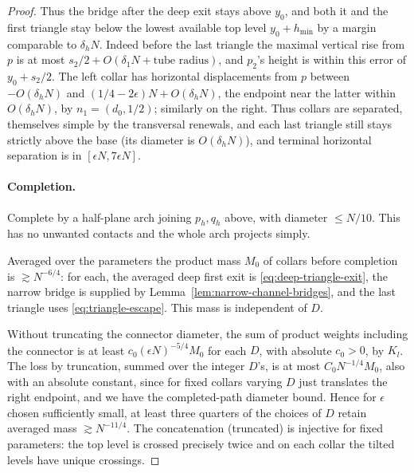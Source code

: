 \begin{proof}
Thus the bridge after the deep exit stays above \(y_0\), and both it and the first triangle stay below the lowest available top level \(y_0+h_{\min}\) by a margin comparable to \(\delta_h N\). Indeed before the last triangle the maximal vertical rise from \(p\) is at most \(s_2/2+O(\delta_1 N+\text{tube radius})\), and \(p_2\)'s height is within this error of \(y_0+s_2/2\). The left collar has horizontal displacements from \(p\) between \(-O(\delta_h N)\) and \((1/4-2\epsilon)N+O(\delta_h N)\), the endpoint near the latter within \(O(\delta_h N)\), by \(n_1=(d_0,1/2)\); similarly on the right. Thus collars are separated, themselves simple by the transversal renewals, and each last triangle still stays strictly above the base (its diameter is \(O(\delta_h N)\)), and terminal horizontal separation is in \([\epsilon N,7\epsilon N]\).

\paragraph{Completion.}
Complete by a half-plane arch joining \(p_h,q_h\) above, with diameter \(\le N/10\). This has no unwanted contacts and the whole arch projects simply.

Averaged over the parameters the product mass \(M_0\) of collars before completion is \(\gtrsim N^{-6/4}\): for each, the averaged deep first exit is \eqref{eq:deep-triangle-exit}, the narrow bridge is supplied by Lemma~\ref{lem:narrow-channel-bridges}, and the last triangle uses \eqref{eq:triangle-escape}. This mass is independent of \(D\).

Without truncating the connector diameter, the sum of product weights including the connector is at least \(c_0(\epsilon N)^{-5/4}M_0\) for each \(D\), with absolute \(c_0>0\), by \(K_l\). The loss by truncation, summed over the integer \(D\)'s, is at most \(C_0 N^{-1/4} M_0\), also with an absolute constant, since for fixed collars varying \(D\) just translates the right endpoint, and we have the completed-path diameter bound. Hence for \(\epsilon\) chosen sufficiently small, at least three quarters of the choices of \(D\) retain averaged mass \(\gtrsim N^{-11/4}\). The concatenation (truncated) is injective for fixed parameters: the top level is crossed precisely twice and on each collar the tilted levels have unique crossings.


\end{proof}
